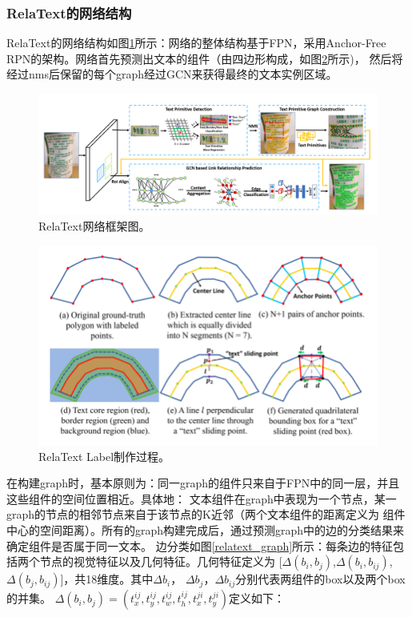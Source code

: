 \subsubsection{RelaText的网络结构}
RelaText的网络结构如图\ref{relatext_framework}所示：网络的整体结构基于FPN，采用Anchor-Free RPN\cite{zhong2019anchor}的架构。网络首先预测出文本的组件（由四边形构成，如图\ref{relatext_gt}所示)，
然后将经过nms后保留的每个graph经过GCN来获得最终的文本实例区域。
\begin{figure}[H]
    \centering
    \includegraphics[width=.98\textwidth]{figure/detection/relatext_framework.png} 
    \caption{RelaText网络框架图。} 
    \label{relatext_framework} 
\end{figure}

\begin{figure}[H]
    \centering
    \includegraphics[width=.8\textwidth]{figure/detection/relatext_gt.png} 
    \caption{RelaText Label制作过程。} 
    \label{relatext_gt} 
\end{figure}

在构建graph时，基本原则为：同一graph的组件只来自于FPN中的同一层，并且这些组件的空间位置相近。具体地：
文本组件在graph中表现为一个节点，某一graph的节点的相邻节点来自于该节点的K近邻（两个文本组件的距离定义为
组件中心的空间距离）。所有的graph构建完成后，通过预测graph中的边的分类结果来确定组件是否属于同一文本。
边分类如图\ref{relatext_graph}所示：每条边的特征包括两个节点的视觉特征以及几何特征。几何特征定义为
[$\Delta(b_{i},b_{j})$,$\Delta(b_{i},b_{ij})$,$\Delta(b_{j},b_{ij})$]，共18维度。其中$\Delta b_{i}$，
$\Delta b_{j}$，$\Delta b_{ij}$分别代表两组件的box以及两个box的并集。
$\Delta(b_{i},b_{j}) = (t_{x}^{ij},t_{y}^{ij},t_{w}^{ij},t_{h}^{ij},t_{x}^{ji},t_{y}^{ji})$定义如下：

